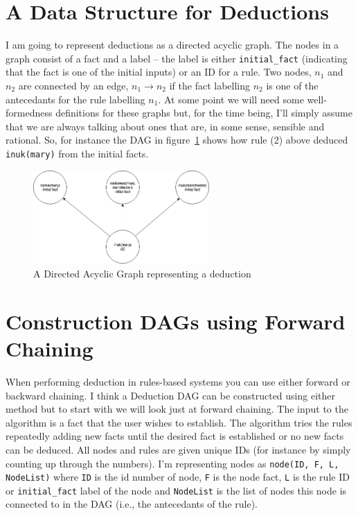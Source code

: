 \documentclass{blue-book}
\begin{document}
\section{A Data Structure for Deductions}
I am going to represent deductions as a directed acyclic graph.  The nodes in a graph consist of a fact and a label -- the label is either \texttt{initial\_fact} (indicating that the fact is one of the initial inputs) or an ID for a rule.  Two nodes, $n_1$ and $n_2$ are connected by an edge, $n_1 \rightarrow n_2$ if the fact labelling $n_2$ is one of the antecedants for the rule labelling $n_1$.  At some point we will need some well-formedness definitions for these graphs but, for the time being, I'll simply assume that we are always talking about ones that are, in some sense, sensible and rational.  So, for instance the DAG in figure~\ref{fig:dag} shows how rule (2) above deduced \texttt{inuk(mary)} from the initial facts.
\begin{figure}[htb]
\begin{center}
\includegraphics[width=0.6\textwidth]{images/bb3_dag.png}
\end{center}
\caption{A Directed Acyclic Graph representing a deduction}
\label{fig:dag}
\end{figure}

\section{Construction DAGs using Forward Chaining}
When performing deduction in rules-based systems you can use either forward or backward chaining.  I think a Deduction DAG can be constructed using either method but to start with we will look just at forward chaining.  The input to the algorithm is a fact that the user wishes to establish.  The algorithm tries the rules repeatedly adding new facts until the desired fact is established or no new facts can be deduced.  All nodes and rules are given unique IDs (for instance by simply counting up through the numbers).  I'm representing nodes as \texttt{node(ID, F, L, NodeList)} where \texttt{ID} is the id number of node, \texttt{F} is the node fact, \texttt{L} is the rule ID or \texttt{initial\_fact} label of the node and \texttt{NodeList} is the list of nodes this node is connected to in the DAG (i.e., the antecedants of the rule).
\end{document}
